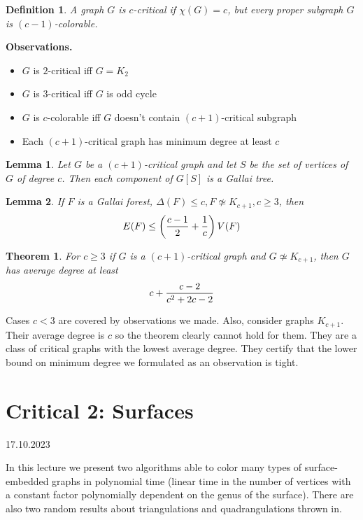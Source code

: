 \documentclass{article}
\newtheorem*{theorem}{Theorem}
\newtheorem*{definition}{Definition}
\newtheorem*{lemma}{Lemma}
\begin{document}
\begin{definition}
	A graph $G$ is \emph{$c$-critical} if $\chi(G) = c$, but every proper
	subgraph $G$ is $(c - 1)$-colorable.
\end{definition}

\noindent
\textbf{Observations.}
\begin{itemize}
	\item $G$ is $2$-critical iff $G = K_2$
	\item $G$ is $3$-critical iff $G$ is odd cycle
	\item $G$ is $c$-colorable iff $G$ doesn't contain $(c+1)$-critical
		subgraph
	\item Each $(c+1)$-critical graph has minimum degree at least $c$
\end{itemize}

\begin{lemma}
	Let $G$ be a $(c+1)$-critical graph and let $S$ be the set of vertices
	of $G$ of degree $c$. Then each component of $G[S]$ is a Gallai tree.
\end{lemma}

\begin{lemma}
	If $F$ is a Gallai forest, $\Delta(F) \le c, F \not \simeq K_{c+1}, c
	\ge 3$, then
	$$ E(F) \le \left ({{c-1}\over2} + {1 \over c} \right ) V(F) $$
\end{lemma}

\begin{theorem}
	For $c \ge 3$ if $G$ is a $(c+1)$-critical graph and $G \not \simeq
	K_{c+1}$, then $G$ has average degree at least
	$$ c + {{c-2}\over{c^2 + 2c - 2}} $$
\end{theorem}

\noindent
Cases $c < 3$ are covered by observations we made. Also, consider graphs
$K_{c+1}$. Their average degree is $c$ so the theorem clearly cannot hold for
them. They are a class of critical graphs with the lowest average degree. They
certify that the lower bound on minimum degree we formulated as an observation
is tight.


\newpage
\section{Critical 2: Surfaces} %
17.10.2023

\noindent
In this lecture we present two algorithms able to color many types of
surface-embedded graphs in polynomial time (linear time in the number of
vertices with a constant factor polynomially dependent on the genus of the
surface). There are also two random results about triangulations and
quadrangulations thrown in.
\end{document}
